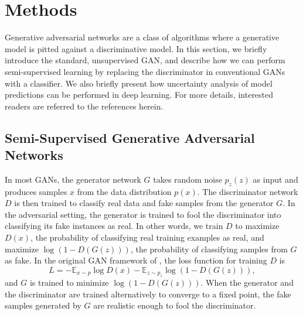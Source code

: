 \documentclass[fleqn,usenatbib]{mnras}
\begin{document}

\section{Methods}
  \label{sec:methods}
  
Generative adversarial networks \citep[GANs;][]{goodfellow2014generative} are a class of algorithms where
a generative model is pitted against a discriminative model.
In this section, we briefly introduce the standard, unsupervised GAN, and describe how we can perform semi-supervised learning
by replacing the discriminator in conventional GANs with a classifier.
We also briefly present how uncertainty analysis of model predictions can be performed in deep learning.
For more details, interested readers are referred to the references herein.

\subsection{Semi-Supervised Generative Adversarial Networks}

In most GANs, the generator network $G$ takes random noise $p_z \left( z \right)$
as input and produces samples $x$ from the data distribution $p \left( x \right)$.
The discriminator network $D$ is then trained to classify real data and fake samples
from the generator $G$.
In the adversarial setting, the generator is trained to fool the discriminator into classifying its
fake instances as real.
In other words, we train $D$ to maximize $D \left( x \right)$,
the probability of classifying real training examples as real,
and maximize $\log \left( 1 - D \left( G \left( z \right) \right) \right)$,
the probability of classifying samples from $G$ as fake.
In the original GAN framework of \citet{goodfellow2014generative}, the loss function for training $D$ is
\begin{equation}
  L = - \mathbb{E}_{x \sim p} \log D \left( x \right)
      - \mathbb{E}_{z \sim p_z} \log \left( 1 - D \left( G \left( z \right) \right) \right),
  \label{eq:original_gan_loss}
\end{equation}
and $G$ is trained to minimize $\log \left( 1 - D \left( G \left( z \right) \right) \right)$.
When the generator and the discriminator are trained alternatively to converge to a fixed point,
the fake samples generated by $G$ are realistic enough to fool the discriminator.
\end{document}
